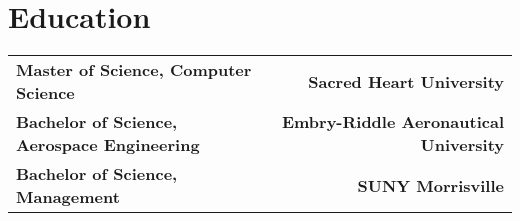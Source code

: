 \section*{Education}
\noindent
\begin{tabularx}{\textwidth}{@{}Xr@{}}
    \textbf{Master of Science, Computer Science} & \textbf{Sacred Heart University} \\
    \textbf{Bachelor of Science, Aerospace Engineering} & \textbf{Embry-Riddle Aeronautical University} \\
    \textbf{Bachelor of Science, Management} & \textbf{SUNY Morrisville} \\
\end{tabularx}
